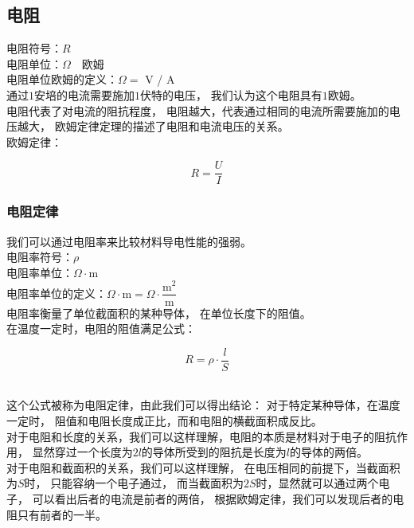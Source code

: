 \documentclass[UTF8]{ctexart}
\begin{document}
\newpage

\subsection{电阻}
    电阻符号：$R$\\[1mm]
    电阻单位：$\Omega$~~欧姆\\[4mm]
    电阻单位欧姆的定义：$\Omega=$ V / A\\[1mm]
    通过$1$安培的电流需要施加$1$伏特的电压，
    我们认为这个电阻具有$1$欧姆。\\[3mm]
    电阻代表了对电流的阻抗程度，
    电阻越大，代表通过相同的电流所需要施加的电压越大，
    欧姆定律定理的描述了电阻和电流电压的关系。\\[3mm]
    欧姆定律：
    \begin{large}
        \begin{equation*}
            R=\frac{U}{I}
        \end{equation*}
    \end{large}
    
\subsubsection{电阻定律}
    我们可以通过电阻率来比较材料导电性能的强弱。\\[3mm]
    电阻率符号：$\rho$\\
    电阻率单位：$\Omega \cdot\text{m}$\\[3mm]
    电阻率单位的定义：$\Omega \cdot \text{m}=\Omega \cdot \dfrac{\text{m}^2}{\text{m}}$\\[3mm]
    电阻率衡量了单位截面积的某种导体，
    在单位长度下的阻值。\\[3mm]
    在温度一定时，电阻的阻值满足公式：
    \begin{large}
        \begin{equation*}
            R = \rho \cdot \dfrac{l}{S}       
        \end{equation*}
    \end{large}\\[3mm]
    这个公式被称为电阻定律，由此我们可以得出结论：
    对于特定某种导体，在温度一定时，
    阻值和电阻长度成正比，而和电阻的横截面积成反比。\\[3mm]
    对于电阻和长度的关系，我们可以这样理解，电阻的本质是材料对于电子的阻抗作用，
    显然穿过一个长度为$2l$的导体所受到的阻抗是长度为$l$的导体的两倍。\\[3mm]
    对于电阻和截面积的关系，我们可以这样理解，
    在电压相同的前提下，当截面积为$S$时，
    只能容纳一个电子通过，
    而当截面积为$2S$时，显然就可以通过两个电子，
    可以看出后者的电流是前者的两倍，
    根据欧姆定律，我们可以发现后者的电阻只有前者的一半。
\end{document}
